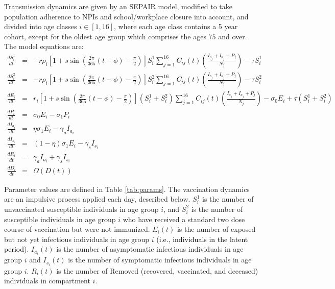 Transmission dynamics are given by an SEPAIR model, modified to take population adherence to NPIs and school/workplace closure into account, and divided into age classes $i \in [1,16]$, where each age class contains a 5 year cohort, except for the oldest age group which comprises the ages $75$ and over. The model equations are:
\textcolor{black}{\begin{eqnarray}
\frac{dS^1_i}{dt} &= & - r \rho_i \left[1 + s \sin\left(\frac{2 \pi}{365} (t - \phi) - \frac{\pi}{2}\right)\right] S^1_i \sum_{j=1}^{16} C_{ij}(t) \left(\frac{I_{s_j} + I_{a_j} + P_j}{N_j}\right) - \tau S^1_i  \label{S1eqn} \\
\frac{dS^2_i}{dt} &= & - r \rho_i \left[1 + s\sin\left(\frac{2 \pi}{365} (t - \phi) - \frac{\pi}{2}\right)\right] S^2_i \sum_{j=1}^{16} C_{ij}(t) \left(\frac{I_{s_j} + I_{a_j}+ P_j}{N_j}\right)  - \tau S^2_i  \label{S2eqn} \\
\frac{dE_i}{dt} &= &  r_i \left[1 + s \sin\left(\frac{2 \pi}{365} (t - \phi) - \frac{\pi}{2}\right)\right]  (S^1_i + S^2_i) \sum_{j=1}^{16} C_{ij}(t) \left(\frac{I_{s_j} + I_{a_j}+ P_j}{N_j}\right) - \sigma_0 E_i + \tau (S^1_i + S^2_i)\label{Eeqn} \\
\frac{dP_i}{dt} &= & \sigma_0 E_i - \sigma_1 P_i \label{Peqn} \\
\frac{dI_{a_i}}{dt} &= & \eta \sigma_1 E_i - \gamma_a I_{a_i}\label{Ieqn} \\
\frac{dI_{s_i}}{dt} &= & (1 - \eta) \sigma_1 E_i - \gamma_s I_{s_i} \label{Ieqn} \\
\frac{dR_i}{dt} &= & \gamma_a I_{a_i} + \gamma_s I_{s_i}  \label{Reqn} \\
\frac{dD_i}{dt} &= & \Omega(D(t)) \label{Deqn} 
\end{eqnarray}}

\noindent Parameter values are defined in Table \ref{tab:params}. The vaccination dynamics are an impulsive process applied each day, described below. $S^{1}_i$ is the number of unvaccinated susceptible individuals in age group $i$, and $S^{2}_i$ is the number of susceptible individuals in age group $i$ who have received a standard two dose course of vaccination but were not immunized. $E_i(t)$ is the number of exposed but not yet infectious individuals in age group $i$ (\textcolor{black}{i.e., individuals in the latent period}). $I_{a_i}(t)$ is the number of asymptomatic infectious individuals in age group $i$ and $I_{s_i}(t)$ is the number of symptomatic infectious individuals in age group $i$. $R_i(t)$ is the number of Removed (recovered, vaccinated, and deceased) individuals in compartment $i$.


